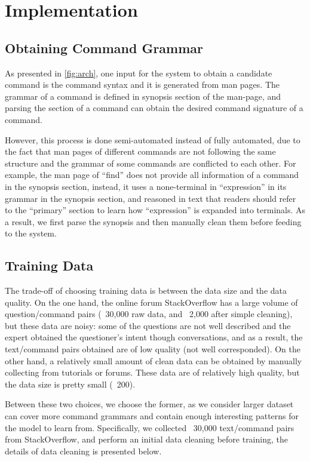 \section{Implementation}

\subsection{Obtaining Command Grammar}
As presented in \autoref{fig:arch}, one input for the system to obtain a candidate command is the command syntax and it is generated from man pages. The grammar of a command is defined in synopsis section of the man-page, and parsing the section of a command can obtain the desired command signature of a command. 

However, this process is done semi-automated instead of fully automated, due to the fact that man pages of different commands are not following the same structure and the grammar of some commands are conflicted to each other. For example, the man page of ``find'' does not provide all information of a command in the synopsis section, instead, it uses a none-terminal in ``expression'' in its grammar in the synopsis section, and reasoned in text that readers should refer to the ``primary'' section to learn how ``expression'' is expanded into terminals. As a result, we first parse the synopsis and then manually clean them before feeding to the system.

\subsection{Training Data}

The trade-off of choosing training data is between the data size and the data quality. On the one hand, the online forum StackOverflow has a large volume of question/command pairs (~30,000 raw data, and ~2,000 after simple cleaning), but these data are noisy: some of the questions are not well described and the expert obtained the questioner's intent though conversations, and as a result, the text/command pairs obtained are of low quality (not well corresponded). On the other hand, a relatively small amount of clean data can be obtained by manually collecting from tutorials or forums. These data are of relatively high quality, but the data size is pretty small (~200).

Between these two choices, we choose the former, as we consider larger dataset can cover more command grammars and contain enough interesting patterns for the model to learn from. Specifically, we collected ~30,000 text/command pairs from StackOverflow, and perform an initial data cleaning before training, the details of data cleaning is presented below.

